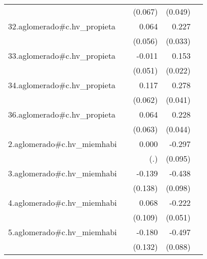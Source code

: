 {\begin{longtable}{l*{4}{D{.}{.}{-1}}}
            &                     &     (0.067)         &     (0.049)         &                     \\
\addlinespace
32.aglomerado#c.hv\_propieta&                     &       0.064         &       0.227\sym{***}&                     \\
            &                     &     (0.056)         &     (0.033)         &                     \\
\addlinespace
33.aglomerado#c.hv\_propieta&                     &      -0.011         &       0.153\sym{***}&                     \\
            &                     &     (0.051)         &     (0.022)         &                     \\
\addlinespace
34.aglomerado#c.hv\_propieta&                     &       0.117         &       0.278\sym{***}&                     \\
            &                     &     (0.062)         &     (0.041)         &                     \\
\addlinespace
36.aglomerado#c.hv\_propieta&                     &       0.064         &       0.228\sym{***}&                     \\
            &                     &     (0.063)         &     (0.044)         &                     \\
\addlinespace
2.aglomerado#c.hv\_miemhabi&                     &       0.000         &      -0.297\sym{**} &                     \\
            &                     &         (.)         &     (0.095)         &                     \\
\addlinespace
3.aglomerado#c.hv\_miemhabi&                     &      -0.139         &      -0.438\sym{***}&                     \\
            &                     &     (0.138)         &     (0.098)         &                     \\
\addlinespace
4.aglomerado#c.hv\_miemhabi&                     &       0.068         &      -0.222\sym{***}&                     \\
            &                     &     (0.109)         &     (0.051)         &                     \\
\addlinespace
5.aglomerado#c.hv\_miemhabi&                     &      -0.180         &      -0.497\sym{***}&                     \\
            &                     &     (0.132)         &     (0.088)         &                     \\

\end{longtable}}
